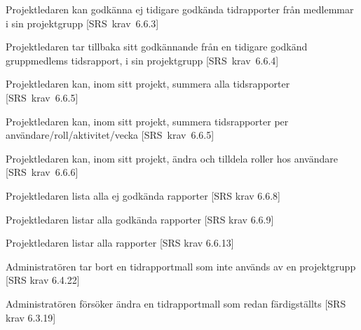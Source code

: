 \documentclass[a4paper]{article}
\begin{document}
\begin{appendices}
\begin{FT}
\item
Projektledaren kan godkänna ej tidigare godkända tidrapporter från medlemmar i sin projektgrupp [SRS~krav~6.6.3]

\item
Projektledaren tar tillbaka sitt godkännande från en tidigare godkänd gruppmedlems tidsrapport, i sin projektgrupp [SRS~krav~6.6.4]

\item
Projektledaren kan, inom sitt projekt, summera alla tidsrapporter [SRS~krav~6.6.5]

\item
Projektledaren kan, inom sitt projekt, summera tidsrapporter per användare/roll/aktivitet/vecka [SRS~krav~6.6.5]

\item
Projektledaren kan, inom sitt projekt, ändra och tilldela roller hos användare [SRS~krav~6.6.6]

\item
Projektledaren lista alla ej godkända rapporter [SRS krav 6.6.8]

\item
Projektledaren listar alla godkända rapporter [SRS krav 6.6.9]

\item
Projektledaren listar alla rapporter [SRS krav 6.6.13]

\item
Administratören tar bort en tidrapportmall som inte används av en projektgrupp [SRS krav 6.4.22]

\item
Administratören försöker ändra en tidrapportmall som redan färdigställts [SRS krav 6.3.19]

\end{FT}
\end{appendices}



\newpage
\end{document}
